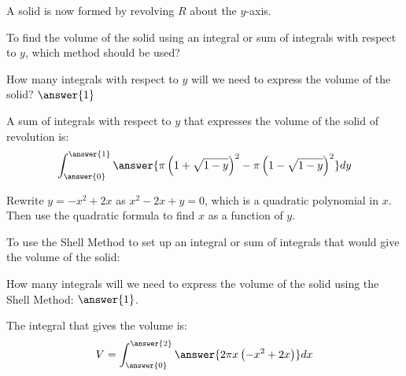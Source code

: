 \documentclass{ximera}
\begin{document}
A solid is now formed by revolving $R$ about the $y$-axis.

To find the volume of the solid using an integral or sum of integrals with respect to $y$, which method should be used?

  \begin{multipleChoice}
  \end{multipleChoice}

How many integrals with respect to $y$ will we need to express the volume of the solid? $\answer{1}$


\begin{exercise}

A sum of integrals with respect to $y$ that expresses the volume of the solid of revolution is: 
\[
\int_{\answer{0}}^{\answer{1}} \answer{\pi \left( 1+\sqrt{1-y} \right)^{2} - \pi \left(1 -\sqrt{1-y} \right)^{2}} dy
\]
\begin{hint}
Rewrite $y=-x^{2}+2x$ as $x^{2}-2x+y=0$, which is a quadratic polynomial in $x$. Then use the quadratic formula to find $x$ as a function of $y$. 
\end{hint}

\end{exercise}

To use the Shell Method to set up an integral or sum of integrals that would give the volume of the solid: 

  \begin{multipleChoice}
  \end{multipleChoice}

How many integrals will we need to express the volume of the solid using the Shell Method: $\answer{1}$. 


\begin{exercise} 
The integral that gives the volume is: 
\[
V=\int_{\answer{0}}^{\answer{2}} \answer{ 2\pi x \left(-x^{2}+2x \right)} dx
\] 


\end{exercise}
\end{document}
